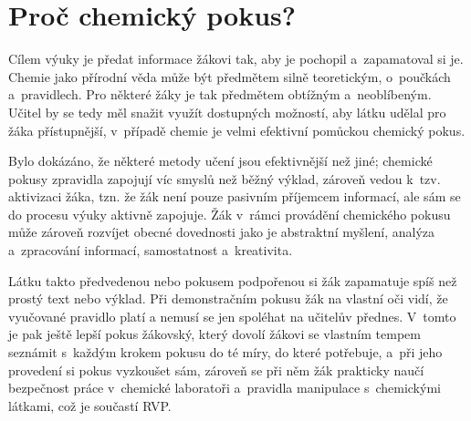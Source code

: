 \section{Proč chemický pokus?}
Cílem výuky je předat informace žákovi tak, aby je pochopil a~zapamatoval si je. Chemie jako přírodní věda může být předmětem silně teoretickým, o~poučkách a~pravidlech. Pro některé žáky je tak předmětem obtížným a~neoblíbeným. \cite{oblibenost} Učitel by se tedy měl snažit využít dostupných možností, aby látku udělal pro žáka přístupnější, v~případě chemie je velmi efektivní pomůckou chemický pokus.

Bylo dokázáno, že některé metody učení jsou efektivnější než jiné; \cite{badani} chemické pokusy zpravidla zapojují víc smyslů než běžný výklad, zároveň vedou k~tzv. aktivizaci žáka, tzn. že žák není pouze pasivním příjemcem informací, ale sám se do procesu výuky aktivně zapojuje. \cite{aktivizace} Žák v~rámci provádění chemického pokusu může zároveň rozvíjet obecné dovednosti jako je abstraktní myšlení, analýza a~zpracování informací, samostatnost a~kreativita. \cite{ostrava} \cite{aktivizace}

Látku takto předvedenou nebo pokusem podpořenou si žák zapamatuje spíš než prostý text nebo výklad. \cite{badani} Při demonstračním pokusu žák na vlastní oči vidí, že vyučované pravidlo platí a nemusí se jen spoléhat na učitelův přednes. V~tomto je pak ještě lepší pokus žákovský, který dovolí žákovi se vlastním tempem seznámit s~každým krokem pokusu do té míry, do které potřebuje, a~při jeho provedení si pokus vyzkoušet sám, zároveň se při něm žák prakticky naučí bezpečnost práce v~chemické laboratoři a~pravidla manipulace s~chemickými látkami, což je součastí RVP.


